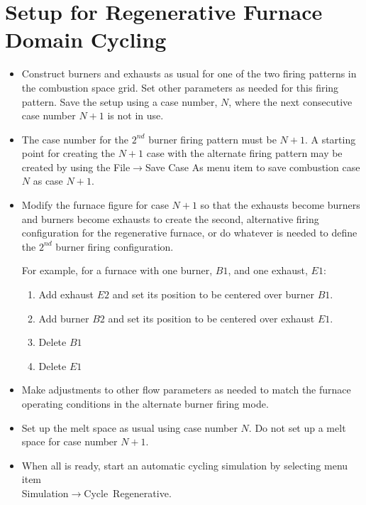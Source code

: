 \documentclass[12pt]{article}
\newcommand{\smenu}[2]{\textsf{#1$\to$#2}}
\numberwithin{equation}{section}
\begin{document}
\section{Setup for Regenerative Furnace Domain Cycling}
\label{sec:regen-setup}
\noindent
\begin{itemize}
\item Construct burners and exhausts as usual for one of the two firing patterns in the combustion space grid. Set other parameters as needed for this firing pattern. Save the setup using a case number, $N$, where the next consecutive case number $N+1$ is not in use.
\item  The case number for the $2^{nd}$ burner firing pattern must be $N+1$. A starting point for creating the $N+1$ case with the alternate firing pattern may be created by using the \smenu{File}{Save Case As} menu item to save combustion case $N$ as case $N+1$.
\item  Modify the furnace figure for case $N+1$ so that the exhausts become burners and burners become exhausts to create the second, alternative firing configuration for the
regenerative furnace, or do whatever is needed to define the $2^{nd}$ burner firing configuration.

 For example, for a furnace with one burner, $B1$, and one exhaust, $E1$:
	\begin{enumerate}
	\item Add exhaust $E2$ and set its position to be centered over burner $B1$.
	\item Add burner $B2$ and set its position to be centered over exhaust $E1$.
	\item Delete $B1$
	\item Delete $E1$
	\end{enumerate}
\item  Make adjustments to other flow parameters as needed to match the furnace operating conditions in the alternate burner firing mode.
\item  Set up the melt space as usual using case number $N$. Do not set up a melt space for case number $N+1$.
\item  When all is ready, start an automatic cycling simulation by selecting menu item \\ \smenu{Simulation}{Cycle~Regenerative}.
\end{itemize}
\end{document}
